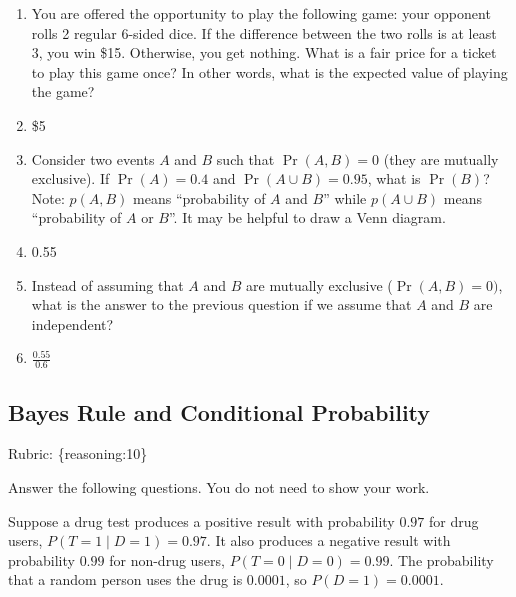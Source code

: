 \documentclass{article}
\def\rubric#1{\gre{Rubric: \{#1\}}}{}
\def\blu#1{{\color{blu}#1}}
\def\gre#1{{\color{gre}#1}}
\begin{document}
\begin{enumerate}
\item You are offered the opportunity to play the following game: your opponent rolls 2 regular 6-sided dice. If the difference between the two rolls is at least 3, you win \$15. Otherwise, you get nothing. What is a fair price for a ticket to play this game once? In other words, what is the expected value of playing the game?
\item[] \gre{\$5}
\item Consider two events $A$ and $B$ such that $\Pr(A, B)=0$ (they are mutually exclusive). If $\Pr(A) = 0.4$ and $\Pr(A \cup B) = 0.95$, what is $\Pr(B)$? Note: $p(A, B)$ means
``probability of $A$ and $B$'' while $p(A \cup B)$ means ``probability of $A$ or $B$''. It may be helpful to draw a Venn diagram.
\item[] \gre{0.55}
\item Instead of assuming that $A$ and $B$ are mutually exclusive ($\Pr(A,B) = 0)$, what is the answer to the previous question if we assume that $A$ and $B$ are independent?
\item[] \gre{$\frac{0.55}{0.6}$}

\end{enumerate}

\subsection{Bayes Rule and Conditional Probability}
\rubric{reasoning:10}

\blu{Answer the following questions.} You do not need to show your work.

Suppose a drug test produces a positive result with probability $0.97$ for drug users, $P(T=1 \mid D=1)=0.97$. It also produces a negative result with probability $0.99$ for non-drug users, $P(T=0 \mid D=0)=0.99$. The probability that a random person uses the drug is $0.0001$, so $P(D=1)=0.0001$.
\end{document}
